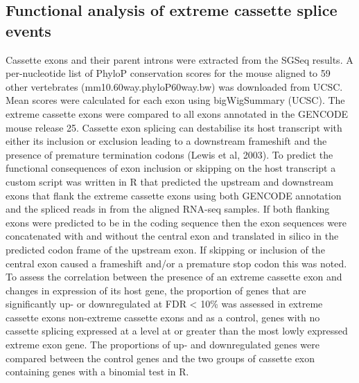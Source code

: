 \subsection{Functional analysis of extreme cassette splice events}
Cassette exons and their parent introns were extracted from the SGSeq results.
A per-nucleotide list of  PhyloP  conservation  scores \citep{Pollard2010-fj} for  the mouse  aligned  to  59  other  vertebrates (mm10.60way.phyloP60way.bw) was downloaded from UCSC. Mean scores were calculated for each exon  using  bigWigSummary  (UCSC). The  extreme  cassette  exons  were  compared  to  all  exons annotated in the GENCODE mouse release 25. Cassette exon splicing can destabilise its host transcript with either its inclusion or exclusion leading to a downstream frameshift and the presence of premature termination codons (Lewis et al, 2003). 
To predict the functional consequences of exon inclusion or skipping on the host transcript a custom script was written in R that predicted the upstream and downstream exons that  flank the extreme cassette exons using both GENCODE annotation and the spliced reads in from the aligned RNA-seq samples. If both flanking exons were predicted to be in the coding sequence then the exon sequences were concatenated with and without the central exon and translated in silico in the predicted codon frame of the upstream exon. If skipping or inclusion of the central exon caused a frameshift and/or a premature stop codon this was noted. 
To  assess  the  correlation  between  the  presence  of  an  extreme  cassette  exon  and  changes  in expression of its host gene, the proportion of genes that are significantly up- or downregulated at FDR < 10\% was assessed in extreme cassette exons non-extreme cassette exons and as a control, genes with no cassette splicing expressed at a level at or greater than the most lowly expressed extreme exon gene. The proportions of up- and downregulated genes were compared between  the control genes and the two groups of cassette exon containing genes with a binomial test in R.   

